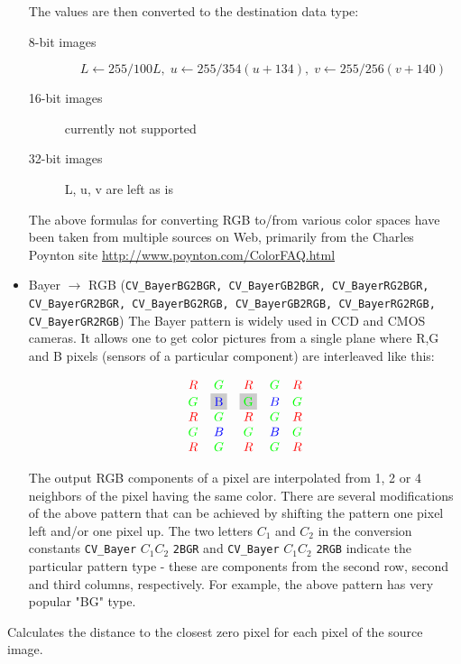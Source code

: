 \begin{itemize}
The values are then converted to the destination data type:
\begin{description}
\item[8-bit images]
\[L \leftarrow 255/100 L,\; u \leftarrow 255/354 (u + 134),\; v \leftarrow 255/256 (v + 140) \]
\item[16-bit images] currently not supported
\item[32-bit images] L, u, v are left as is
\end{description}

The above formulas for converting RGB to/from various color spaces have been taken from multiple sources on Web, primarily from the Charles Poynton site \url{http://www.poynton.com/ColorFAQ.html}

 \item Bayer $\rightarrow$ RGB (\texttt{CV\_BayerBG2BGR, CV\_BayerGB2BGR, CV\_BayerRG2BGR, CV\_BayerGR2BGR, CV\_BayerBG2RGB, CV\_BayerGB2RGB, CV\_BayerRG2RGB, CV\_BayerGR2RGB}) The Bayer pattern is widely used in CCD and CMOS cameras. It allows one to get color pictures from a single plane where R,G and B pixels (sensors of a particular component) are interleaved like this:

\newcommand{\R}{\color{red}R}
\newcommand{\G}{\color{green}G}
\newcommand{\B}{\color{blue}B}


\[
\definecolor{BackGray}{rgb}{0.8,0.8,0.8}
\begin{array}{ c c c c c }
\R&\G&\R&\G&\R\\
\G&\colorbox{BackGray}{\B}&\colorbox{BackGray}{\G}&\B&\G\\
\R&\G&\R&\G&\R\\
\G&\B&\G&\B&\G\\
\R&\G&\R&\G&\R
\end{array}
\]

The output RGB components of a pixel are interpolated from 1, 2 or
4 neighbors of the pixel having the same color. There are several
modifications of the above pattern that can be achieved by shifting
the pattern one pixel left and/or one pixel up. The two letters
$C_1$ and $C_2$
in the conversion constants
\texttt{CV\_Bayer} $ C_1 C_2 $ \texttt{2BGR}
and
\texttt{CV\_Bayer} $ C_1 C_2 $ \texttt{2RGB}
indicate the particular pattern
type - these are components from the second row, second and third
columns, respectively. For example, the above pattern has very
popular "BG" type.
\end{itemize}



\label{distanceTransform}
Calculates the distance to the closest zero pixel for each pixel of the source image.

